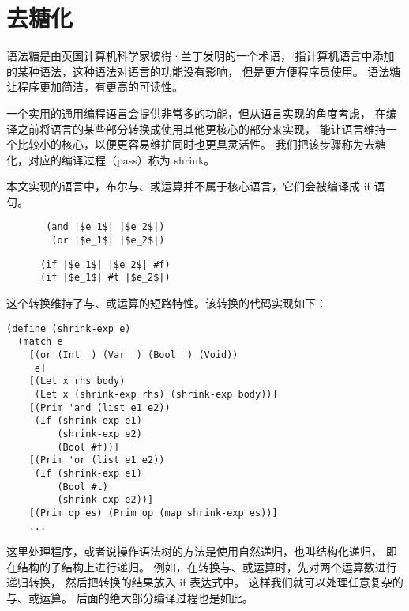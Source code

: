 
\section{去糖化}

语法糖是由英国计算机科学家彼得·兰丁发明的一个术语，
指计算机语言中添加的某种语法，这种语法对语言的功能没有影响，
但是更方便程序员使用。
语法糖让程序更加简洁，有更高的可读性。

一个实用的通用编程语言会提供非常多的功能，但从语言实现的角度考虑，
在编译之前将语言的某些部分转换成使用其他更核心的部分来实现，
能让语言维持一个比较小的核心，以便更容易维护同时也更具灵活性。
我们把该步骤称为去糖化，对应的编译过程（pass）称为 shrink。

本文实现的语言中，布尔与、或运算并不属于核心语言，它们会被编译成 if 语句。
\begin{transformation}
\begin{lstlisting}
       (and |$e_1$| |$e_2$|)
        (or |$e_1$| |$e_2$|)
\end{lstlisting}
\compilesto
\begin{lstlisting}
      (if |$e_1$| |$e_2$| #f)
      (if |$e_1$| #t |$e_2$|)
\end{lstlisting}
\end{transformation}


\begin{comment}
\begin{align*}
  \CAND{e_1}{e_2} & \quad \Rightarrow \quad \CIF{e_1}{e_2}{\FALSE{}}\\
  \COR{e_1}{e_2} & \quad \Rightarrow \quad \CIF{e_1}{\TRUE{}}{e_2}
\end{align*}
\end{comment}

\begin{comment}
\begin{transformation}
\CAND{e_1}{e_2}
\compilesto
\begin{lstlisting}
\CIF{e_1}{e_2}{\FALSE{}}
\end{transformation}
\end{comment}


这个转换维持了与、或运算的短路特性。该转换的代码实现如下：

\begin{lstlisting}
(define (shrink-exp e)
  (match e
    [(or (Int _) (Var _) (Bool _) (Void))
     e]
    [(Let x rhs body)
     (Let x (shrink-exp rhs) (shrink-exp body))]
    [(Prim 'and (list e1 e2))
     (If (shrink-exp e1)
         (shrink-exp e2)
         (Bool #f))]
    [(Prim 'or (list e1 e2))
     (If (shrink-exp e1)
         (Bool #t)
         (shrink-exp e2))]
    [(Prim op es) (Prim op (map shrink-exp es))]
    ...
\end{lstlisting}

这里处理程序，或者说操作语法树的方法是使用自然递归，也叫结构化递归，
即在结构的子结构上进行递归。
例如，在转换与、或运算时，先对两个运算数进行递归转换，
然后把转换的结果放入 if 表达式中。
这样我们就可以处理任意复杂的与、或运算。
后面的绝大部分编译过程也是如此。
